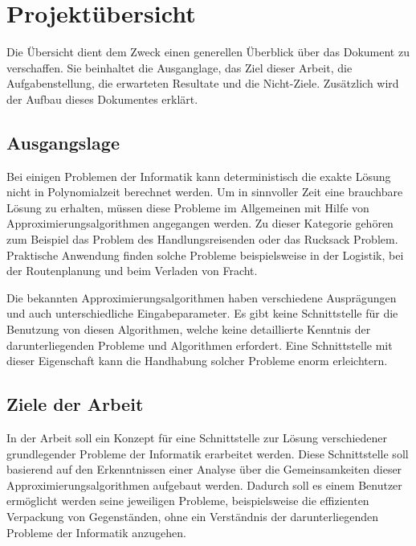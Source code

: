 %
%

\chapter{Projektübersicht}\label{chap.projektuebersicht}
Die Übersicht dient dem Zweck einen generellen Überblick über das Dokument zu verschaffen. Sie beinhaltet die Ausganglage, das Ziel dieser Arbeit, die Aufgabenstellung, die erwarteten Resultate und die Nicht-Ziele. Zusätzlich wird der Aufbau dieses Dokumentes erklärt.

\section{Ausgangslage}\label{ausganglage}
Bei einigen Problemen der Informatik kann deterministisch die exakte Lösung nicht in Polynomialzeit berechnet werden. Um in sinnvoller Zeit eine brauchbare Lösung zu erhalten, müssen diese Probleme im Allgemeinen mit Hilfe von Approximierungsalgorithmen angegangen werden. Zu dieser Kategorie gehören zum Beispiel das Problem des Handlungsreisenden oder das Rucksack Problem. Praktische Anwendung finden solche Probleme beispielsweise in der Logistik, bei der Routenplanung und beim Verladen von Fracht.

Die bekannten Approximierungsalgorithmen haben verschiedene Ausprägungen und auch unterschiedliche Eingabeparameter. Es gibt keine Schnittstelle für die Benutzung von diesen Algorithmen, welche keine detaillierte Kenntnis der darunterliegenden Probleme und Algorithmen erfordert. Eine Schnittstelle mit dieser Eigenschaft kann die Handhabung solcher Probleme enorm erleichtern.

\section{Ziele der Arbeit}\label{ziele}
In der Arbeit soll ein Konzept für eine Schnittstelle zur Lösung verschiedener grundlegender Probleme der Informatik erarbeitet werden. Diese Schnittstelle soll basierend auf den Erkenntnissen einer Analyse über die Gemeinsamkeiten dieser Approximierungsalgorithmen aufgebaut werden. Dadurch soll es einem Benutzer ermöglicht werden seine jeweiligen Probleme, beispielsweise die effizienten Verpackung von Gegenständen, ohne ein Verständnis der darunterliegenden Probleme der Informatik anzugehen.

